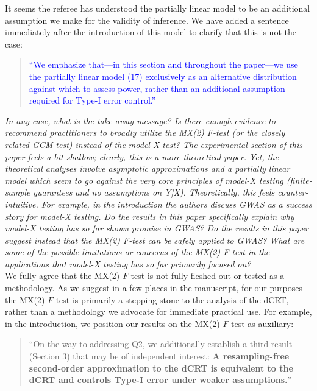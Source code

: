 \documentclass[12pt]{article}
\begin{document}
\noindent It seems the referee has understood the partially linear model to be an additional assumption we make for the validity of inference. We have added a sentence immediately after the introduction of this model to clarify that this is not the case:

\begin{quote}
	\textcolor{blue}{``We emphasize that---in this section and throughout the paper---we use the partially linear model (17) exclusively as an alternative distribution against which to assess power, rather than an additional assumption required for Type-I error control.''}
\end{quote}


\textsl{In any case, what is the take-away message? Is there enough evidence to recommend practitioners to broadly utilize the MX(2) F-test (or the closely related GCM test) instead of the model-X test? The experimental section of this paper feels a bit shallow; clearly, this is a more theoretical paper. Yet, the theoretical analyses involve asymptotic approximations and a partially linear model which seem to go against the very core principles of model-X testing (finite-sample guarantees and no assumptions on Y|X). Theoretically, this feels counter-intuitive. For example, in the introduction the authors discuss GWAS as a success story for model-X testing. Do the results in this paper specifically explain why model-X testing has so far shown promise in GWAS? Do the results in this paper suggest instead that the MX(2) F-test can be safely applied to GWAS? What are some of the possible limitations or concerns of the MX(2) F-test in the applications that model-X testing has so far primarily focused on?}
\\

\noindent We fully agree that the MX(2) $F$-test is not fully fleshed out or tested as a methodology. As we suggest in a few places in the manuscript, for our purposes the MX(2) $F$-test is primarily a stepping stone to the analysis of the dCRT, rather than a methodology we advocate for immediate practical use. For example, in the introduction, we position our results on the MX(2) $F$-test as auxiliary:

\begin{quote}
``On the way to addressing Q2, we additionally establish a third result (Section 3) that may be of independent interest: \textbf{A resampling-free second-order approximation to the dCRT is equivalent to the dCRT and controls Type-I error under weaker assumptions.}''
\end{quote}
\end{document}
